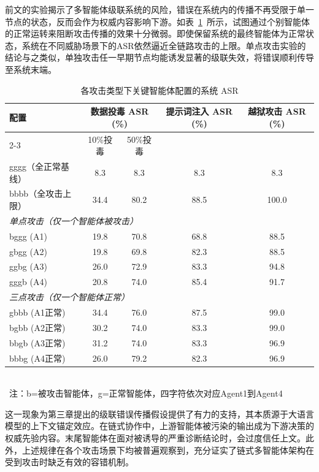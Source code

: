 前文的实验揭示了多智能体级联系统的风险，错误在系统内的传播不再受限于单一节点的状态，反而会作为权威内容影响下游。如表~\ref{tab:cascade-results}~所示，试图通过个别智能体的正常运转来阻断攻击传播的效果十分微弱。即使保留系统的最终智能体为正常状态，系统在不同威胁场景下的ASR依然逼近全链路攻击的上限。单点攻击实验的结论与之类似，单独攻击任一早期节点均能诱发显著的级联失效，将错误顺利传导至系统末端。

\begin{table}[htbp]
\centering
\caption{各攻击类型下关键智能体配置的系统 ASR}
\label{tab:cascade-results}
\begin{tabular}{lcccc}
\toprule
\multirow{2}{*}{配置} & \multicolumn{2}{c}{数据投毒 ASR (\%)} & \multirow{2}{*}{提示词注入 ASR (\%)} & \multirow{2}{*}{越狱攻击 ASR (\%)} \\
\cmidrule(lr){2-3}
 & 10\%投毒 & 50\%投毒 & & \\
\midrule
gggg（全正常基线） & 8.3 & 8.3 & 8.3 & 8.3 \\
bbbb（全攻击上限） & 34.4 & 80.2 & 88.5 & 100.0 \\
\midrule
\multicolumn{5}{l}{\textit{单点攻击（仅一个智能体被攻击）}} \\
bggg (A1) & 19.8 & 70.8 & 68.8 & 88.5 \\
gbgg (A2) & 19.8 & 69.8 & 82.3 & 88.5 \\
ggbg (A3) & 26.0 & 72.9 & 83.3 & 94.8 \\
gggb (A4) & 20.8 & 74.0 & 85.4 & 91.7 \\
\midrule
\multicolumn{5}{l}{\textit{三点攻击（仅一个智能体正常）}} \\
gbbb (A1正常) & 34.4 & 76.0 & 87.5 & 99.0 \\
bgbb (A2正常) & 30.2 & 74.0 & 83.3 & 99.0 \\
bbgb (A3正常) & 31.2 & 74.0 & 83.3 & 96.9 \\
bbbg (A4正常) & 26.0 & 79.2 & 82.3 & 96.9 \\
\bottomrule
\end{tabular}
\\\ \footnotesize{注：b=被攻击智能体，g=正常智能体，四字符依次对应Agent1到Agent4}
\end{table}

这一现象为第三章提出的级联错误传播假设提供了有力的支持，其本质源于大语言模型的上下文锚定效应。在链式协作中，上游智能体被污染的输出成为下游决策的权威先验内容。末尾智能体在面对被诱导的严重诊断结论时，会过度信任上文。此外，上述规律在各个攻击场景下均被普遍观察到，充分证实了链式多智能体架构在受到攻击时缺乏有效的容错机制。

